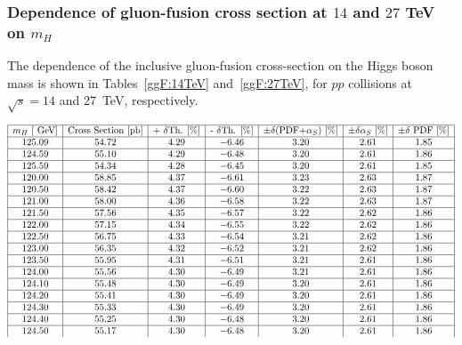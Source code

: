 \subsubsection{Dependence of gluon-fusion cross section  at $14$ and $27$ TeV on $m_H$}
\label{sec:ggFmhdep}
The dependence of the inclusive gluon-fusion cross-section on the Higgs boson mass is shown in
Tables~\ref{ggF:14TeV} and~\ref{ggF:27TeV}, for $pp$ collisions at $\sqrt{s}=14$ and 27~TeV, respectively.
\begin{table}[!h]
\begin{center}
\begin{equation}
\begin{array}{|c|c|c|c|c|c|c|}
 \hline
 m_H  \text{ [\ensuremath{~\text{GeV}}]}&\text{Cross Section [pb]}&\text{+ $\delta$Th. [\%]}&\text{- $\delta$Th. [\%]}&\pm\delta\text{(PDF+$\alpha_S$) [\%]}& \pm\delta\text{$\alpha_S$ [\%]} & \pm\delta\text{ PDF [\%]}  \\
\hline 
125.09 & 54.72 & 4.29 & -6.46 & 3.20 & 2.61 & 1.85\\
\hline 
124.59 & 55.10 & 4.29 & -6.48 & 3.20 & 2.61 & 1.86\\
\hline 
125.59 & 54.34 & 4.28 & -6.45 & 3.20 & 2.61 & 1.85\\
\hline 
120.00 & 58.85 & 4.37 & -6.61 & 3.23 & 2.63 & 1.87\\
\hline 
120.50 & 58.42 & 4.37 & -6.60 & 3.22 & 2.63 & 1.87\\
\hline 
121.00 & 58.00 & 4.36 & -6.58 & 3.22 & 2.63 & 1.87\\
\hline 
121.50 & 57.56 & 4.35 & -6.57 & 3.22 & 2.62 & 1.86\\
\hline 
122.00 & 57.15 & 4.34 & -6.55 & 3.22 & 2.62 & 1.86\\
\hline 
122.50 & 56.75 & 4.33 & -6.54 & 3.21 & 2.62 & 1.86\\
\hline 
123.00 & 56.35 & 4.32 & -6.52 & 3.21 & 2.62 & 1.86\\
\hline 
123.50 & 55.95 & 4.31 & -6.51 & 3.21 & 2.61 & 1.86\\
\hline 
124.00 & 55.56 & 4.30 & -6.49 & 3.21 & 2.61 & 1.86\\
\hline 
124.10 & 55.48 & 4.30 & -6.49 & 3.20 & 2.61 & 1.86\\
\hline 
124.20 & 55.41 & 4.30 & -6.49 & 3.20 & 2.61 & 1.86\\
\hline 
124.30 & 55.33 & 4.30 & -6.49 & 3.20 & 2.61 & 1.86\\
\hline 
124.40 & 55.25 & 4.30 & -6.48 & 3.20 & 2.61 & 1.86\\
\hline 
124.50 & 55.17 & 4.30 & -6.48 & 3.20 & 2.61 & 1.86\\

\end{array}
\end{equation}
\end{center}
\end{table}
